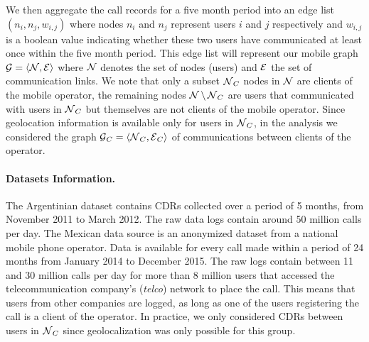 We then aggregate the call records for a five 
month period into an edge list $(n_i, n_j, w_{i,j})$ where nodes $n_i$ and $n_j$ 
represent users $i$ and $j$ respectively and $w_{i,j}$ is a boolean value
indicating whether these two users have communicated at least once within the 
five month period. This edge list will represent our mobile graph  
$\operatorname{\mathcal{G}} = \left< \operatorname{\mathcal{N}}, \operatorname{\mathcal{E}} \right> $ where $\operatorname{\mathcal{N}}$ denotes the set of nodes (users) 
and $\operatorname{\mathcal{E}}$ the set of communication links. We note that only a subset $\operatorname{\mathcal{N}}_C$ nodes in $\operatorname{\mathcal{N}}$
are clients of the mobile operator, the remaining nodes $\operatorname{\mathcal{N}} \setminus \operatorname{\mathcal{N}}_C$ are
users that communicated with users in $ \operatorname{\mathcal{N}}_C $ but themselves are not clients of
the mobile operator. 
Since geolocation information is available only for users in $\operatorname{\mathcal{N}}_C$, in the analysis we considered the graph $\operatorname{\mathcal{G}}_C = \left< \operatorname{\mathcal{N}}_C, \operatorname{\mathcal{E}}_C \right> $ of communications between clients of the operator.

\paragraph{Datasets Information.}
The Argentinian dataset contains CDRs collected over a period of 5 months, from November 2011 to March 2012. The raw data logs contain around 50 million calls per day.
The Mexican data source is an anonymized dataset from a national mobile phone operator. Data is available for every call made within a period of 24 months from January 2014 to December 2015. The raw logs contain between 11 and 30 million calls per day for more than 8 million users that accessed the telecommunication company's (\textit{telco}) network to place the call. This means that users from other companies are logged, as long as one of the users registering the call is a client of the operator. In practice, we only considered CDRs between users in $\operatorname{\mathcal{N}}_C$ since geolocalization was only possible for this group.



